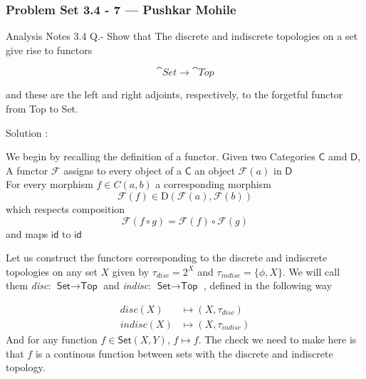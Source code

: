 
\begin{frame}
    \frametitle{Problem Set 3.4 - 7 --- Pushkar Mohile}
    Analysis Notes 3.4 Q.- Show that The discrete and indiscrete topologies on a
    set give rise to functors

\begin{equation}
    \cat{Set}\to \cat{Top}
\end{equation}    
    
    and these are the left and right adjoints, respectively, to the forgetful
    functor from Top to Set. 
\end{frame}
\begin{frame}
    
Solution : 

We begin by recalling the definition of a functor. Given two Categories
\(\textsf{C}\) amd \(\textsf{D}\), A functor \(\mathcal{F} \) assigns to every
object of a \(\textsf{C}\) an object \(\mathcal{F}(a)\) in \(\textsf{D}\) \\
For every morphism \(f \in C(a,b)\) a corresponding morphism 
\begin{equation}
\mathcal{F}(f) \in \text{D}(\mathcal{F}(a), \mathcal{F}(b) )
\end{equation}
which respects composition 
\begin{equation}
    \mathcal{F}(f\circ g) = \mathcal{F}(f) \circ \mathcal{F}(g)
\end{equation}
    and maps \(\textsf{id} \text{ to } \textsf{id}\) 
\end{frame}

\begin{frame}
    
Let us construct the functors corresponding to the discrete and indiscrete
topologies on any set \(X\) given by \(\tau_{disc} = 2^X\) and \(\tau_{indisc} =
\{\phi,X \}\). We will call them \textit{disc}: \(\textsf{Set} \to
\textsf{Top}\) and \textit{indisc}: \(\textsf{Set}\to \textsf{Top}\) , defined
in the following way 

\begin{align*}
    \textit{disc}(X) &\mapsto (X, \tau_{disc}) \\
    \textit{indisc}(X) &\mapsto (X,\tau_{indisc}) 
\end{align*}
And for any function \(f \in \textsf{Set}(X,Y)\), \(f\mapsto f\). 
The check we need to make here is that \(f\) is a continous function between
sets with the discrete and indiscrete topology. 
\end{frame}

